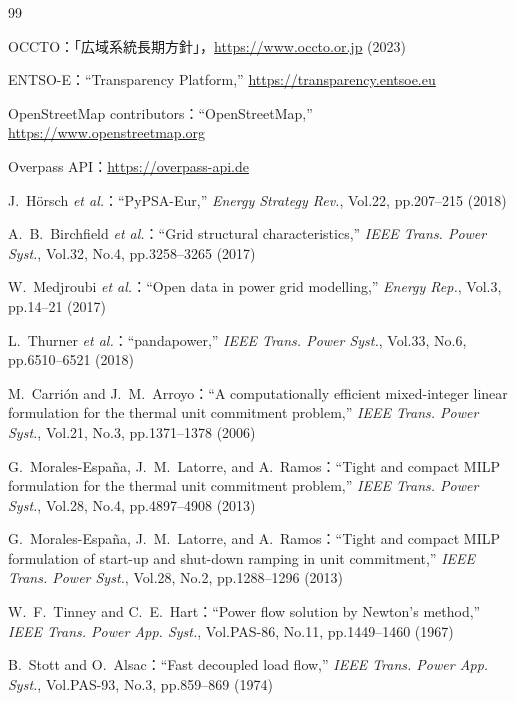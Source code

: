 \documentclass[fleqn]{ieej}
\begin{document}
{\small
\begin{thebibliography}{99}
\setlength{\itemsep}{0pt}\setlength{\parsep}{0pt}\setlength{\topsep}{2pt}

OCCTO：「広域系統長期方針」，\url{https://www.occto.or.jp} (2023)

ENTSO-E：``Transparency Platform,'' \url{https://transparency.entsoe.eu}

OpenStreetMap contributors：``OpenStreetMap,'' \url{https://www.openstreetmap.org}

Overpass API：\url{https://overpass-api.de}

J.~H\"orsch \textit{et al.}：``PyPSA-Eur,''
\textit{Energy Strategy Rev.}, Vol.22, pp.207--215 (2018)

A.~B.~Birchfield \textit{et al.}：``Grid structural characteristics,''
\textit{IEEE Trans. Power Syst.}, Vol.32, No.4, pp.3258--3265 (2017)

W.~Medjroubi \textit{et al.}：``Open data in power grid modelling,''
\textit{Energy Rep.}, Vol.3, pp.14--21 (2017)

L.~Thurner \textit{et al.}：``pandapower,''
\textit{IEEE Trans. Power Syst.}, Vol.33, No.6, pp.6510--6521 (2018)

M.~Carri\'{o}n and J.~M.~Arroyo：``A computationally efficient mixed-integer linear
formulation for the thermal unit commitment problem,''
\textit{IEEE Trans. Power Syst.}, Vol.21, No.3, pp.1371--1378 (2006)

G.~Morales-Espa\~{n}a, J.~M.~Latorre, and A.~Ramos：``Tight and compact MILP
formulation for the thermal unit commitment problem,''
\textit{IEEE Trans. Power Syst.}, Vol.28, No.4, pp.4897--4908 (2013)

G.~Morales-Espa\~{n}a, J.~M.~Latorre, and A.~Ramos：``Tight and compact MILP
formulation of start-up and shut-down ramping in unit commitment,''
\textit{IEEE Trans. Power Syst.}, Vol.28, No.2, pp.1288--1296 (2013)

W.~F.~Tinney and C.~E.~Hart：``Power flow solution by Newton's method,''
\textit{IEEE Trans. Power App. Syst.}, Vol.PAS-86, No.11, pp.1449--1460 (1967)

B.~Stott and O.~Alsac：``Fast decoupled load flow,''
\textit{IEEE Trans. Power App. Syst.}, Vol.PAS-93, No.3, pp.859--869 (1974)


\end{thebibliography}}
\end{document}

